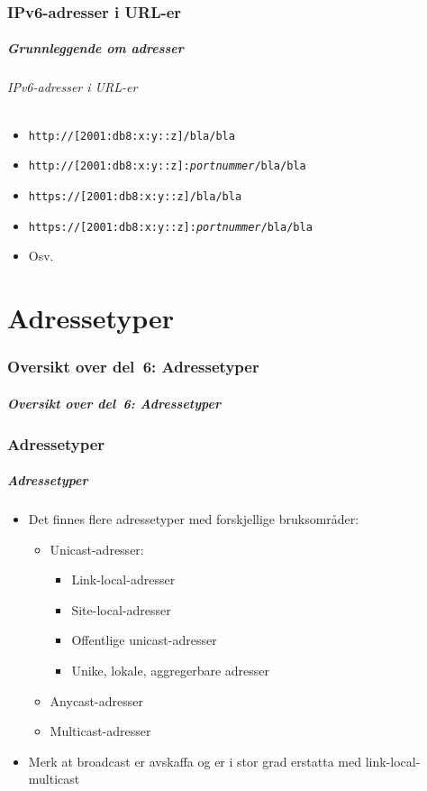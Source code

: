 \section{IPv6-adresser i URL-er}
\begin{frame}%
  \frametitle{Grunnleggende om adresser}
  \framesubtitle{IPv6-adresser i URL-er}
  \begin{itemize}%
  \item \texttt{http://[2001:db8:x:y::z]/bla/bla}
  \item \texttt{http://[2001:db8:x:y::z]:\textit{portnummer}/bla/bla}
  \item \texttt{https://[2001:db8:x:y::z]/bla/bla}
  \item \texttt{https://[2001:db8:x:y::z]:\textit{portnummer}/bla/bla}
  \item Osv.
  \end{itemize}
\end{frame}

\part{Adressetyper}

\begin{frame}
  \partpage
\end{frame}

\section*{Oversikt over del~6: Adressetyper}
\begin{frame}%
  \frametitle{Oversikt over del~6: Adressetyper}
    \tableofcontents%
\end{frame}

\section{Adressetyper}
\begin{frame}%
  \frametitle{Adressetyper}
  \begin{itemize}%
  \item Det finnes flere adressetyper med forskjellige bruksområder:
    \begin{itemize}%
    \item Unicast-adresser:
      \begin{itemize}%
      \item Link-local-adresser
      \item Site-local-adresser
      \item Offentlige unicast-adresser
      \item Unike, lokale, aggregerbare adresser
      \end{itemize}
    \item Anycast-adresser
    \item Multicast-adresser
    \end{itemize}
  \item Merk at broadcast er avskaffa og er i stor grad erstatta med
    link-local-multicast
  \end{itemize}
\end{frame}

